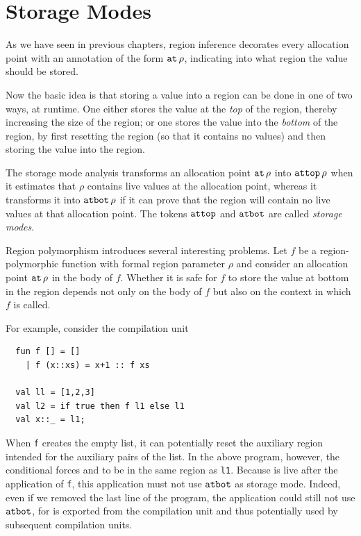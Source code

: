 \documentclass[12pt]{book}
\begin{document}
\section{Storage Modes}
%
As we have seen in previous chapters, region inference decorates every
%
%
allocation point with an annotation of the form $\mathbin{\hbox{\tt at}}\,\rho$,
indicating into what region the value should be stored.

Now the basic idea is that storing a value into a region can be done
in one of two ways, at runtime. One either stores the value at the 
%
{\em top} of the region, thereby increasing the size of the region; or
one stores the value into the 
%
{\em bottom} of the region, by first resetting the region (so that it
contains no values) and then storing the value into the region.

The storage mode analysis transforms an allocation point $\mathbin{\hbox{\tt at}}\,\rho$ into 
%
$\hbox{\tt attop}\,\rho$ when it estimates that $\rho$ contains live values at the allocation point, whereas it
transforms it into 
%
$\hbox{\tt atbot}\,\rho$ if it can prove that the region will contain no live
values at that allocation point. The tokens $\hbox{\tt attop}$ and $\hbox{\tt atbot}$ are
called 
%
{\em storage modes}.

%
Region polymorphism introduces several interesting problems. Let $f$ be
a region-polymorphic function with formal region parameter $\rho$ and
consider an allocation point $\mathbin{\hbox{\tt at}}\,\rho$ in the body of $f$.
Whether it is safe for $f$ to store the value at bottom in the region
depends not only on the body of $f$ but also on the context in which
$f$ is called.

For example, consider the compilation unit
\begin{verbatim}
  fun f [] = []
    | f (x::xs) = x+1 :: f xs

  val ll = [1,2,3]
  val l2 = if true then f l1 else l1
  val x::_ = l1;
\end{verbatim}
When {\tt f} creates the empty list, it can potentially reset the 
%
auxiliary region intended for the 
%
auxiliary pairs of the list. In the above program, however, the
conditional forces  and  to be in the same
region as {\tt l1}.  Because  is live after the application
of {\tt f}, this application must not use $\hbox{\tt atbot}$ as storage mode.
Indeed, even if we removed the last line of the program, the
application could still not use $\hbox{\tt atbot}$, for  is
exported from the compilation unit and thus potentially used by
subsequent compilation units.
\end{document}
